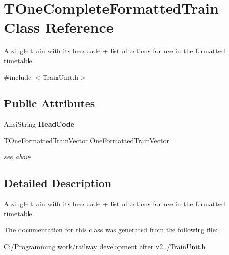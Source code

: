 \hypertarget{class_t_one_complete_formatted_train}{}\section{T\+One\+Complete\+Formatted\+Train Class Reference}
\label{class_t_one_complete_formatted_train}


A single train with its headcode + list of actions for use in the formatted timetable.  




{\ttfamily \#include $<$Train\+Unit.\+h$>$}

\subsection*{Public Attributes}
\begin{DoxyCompactItemize}
\item 
\mbox{\label{class_t_one_complete_formatted_train_a64e2c06ac8ceb57b8f2cf4fe316fdd09}} 
Ansi\+String {\bfseries Head\+Code}
\item 
\mbox{\label{class_t_one_complete_formatted_train_a7153d13265831ee7c241779b5c803278}} 
T\+One\+Formatted\+Train\+Vector \mbox{\hyperlink{class_t_one_complete_formatted_train_a7153d13265831ee7c241779b5c803278}{One\+Formatted\+Train\+Vector}}
\begin{DoxyCompactList}\small\item\em see above \end{DoxyCompactList}\end{DoxyCompactItemize}


\subsection{Detailed Description}
A single train with its headcode + list of actions for use in the formatted timetable. 

The documentation for this class was generated from the following file\+:\begin{DoxyCompactItemize}
\item 
C\+:/\+Programming work/railway development after v2../Train\+Unit.\+h\end{DoxyCompactItemize}
